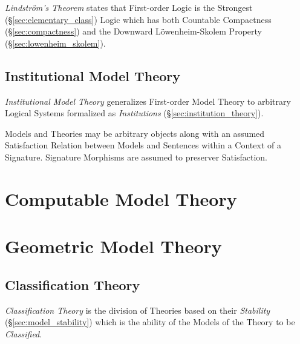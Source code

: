 \emph{Lindstr\"om's Theorem} states that First-order Logic is the
Strongest (\S\ref{sec:elementary_class}) Logic which has both
Countable Compactness (\S\ref{sec:compactness}) and the Downward
L\"owenheim-Skolem Property (\S\ref{sec:lowenheim_skolem}).



\subsection{Institutional Model Theory}\label{sec:institutional_model}

\emph{Institutional Model Theory} generalizes First-order Model Theory
to arbitrary Logical Systems formalized as \emph{Institutions}
(\S\ref{sec:institution_theory}).

Models and Theories may be arbitrary objects along with an assumed
Satisfaction Relation between Models and Sentences within a Context of
a Signature. Signature Morphisms are assumed to preserver
Satisfaction.



\section{Computable Model Theory}\label{sec:computable_model}
\cite{harizanov98}




\section{Geometric Model Theory}\label{sec:geometric_model}

\subsection{Classification Theory}\label{sec:classification_theory}

\emph{Classification Theory} is the division of Theories based on their
\emph{Stability} (\S\ref{sec:model_stability}) which is the ability of the
Models of the Theory to be \emph{Classified}.

